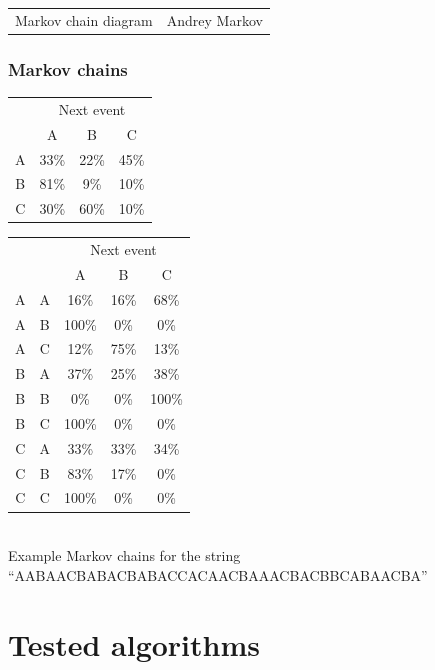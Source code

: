 \documentclass[12pt]{beamer}
\begin{document}
\begin{frame}
\begin{center}
\begin{tabular}{l r}
                    Markov chain diagram & Andrey Markov
                \end{tabular}
            \end{center}
        \end{frame}
        \begin{frame}
            \frametitle{Markov chains}
            \begin{tabular}{|c|c|c|c|}
                \hline
                & \multicolumn{3}{|c|}{Next event} \\ \cline{2-4}
                & A & B & C \\ \hline
                A & 33\% & 22\% & 45\% \\ \hline
                B & 81\% & 9\% & 10\% \\ \hline
                C & 30\% & 60\% & 10\% \\ \hline
            \end{tabular}
            \begin{tabular}{|c|c|c|c|c|}
                \hline
                \multicolumn{2}{|c|}{} & \multicolumn{3}{|c|}{Next event} \\ \cline{3-5}
                \multicolumn{2}{|c|}{} & A & B & C \\ \hline
                A & A & 16\% & 16\% & 68\% \\ \hline
                A & B & 100\% & 0\% & 0\% \\ \hline
                A & C & 12\% & 75\% & 13\% \\ \hline
                B & A & 37\% & 25\% & 38\% \\ \hline
                B & B & 0\% & 0\% & 100\% \\ \hline
                B & C & 100\% & 0\% & 0\% \\ \hline
                C & A & 33\% & 33\% & 34\% \\ \hline
                C & B & 83\% & 17\% & 0\% \\ \hline
                C & C & 100\% & 0\% & 0\% \\ \hline
            \end{tabular}\\
            Example Markov chains for the string \\``AABAACBABACBABACCACAACBAAACBACBBCABAACBA''
        \end{frame}
        \section{Tested algorithms}
\end{document}
